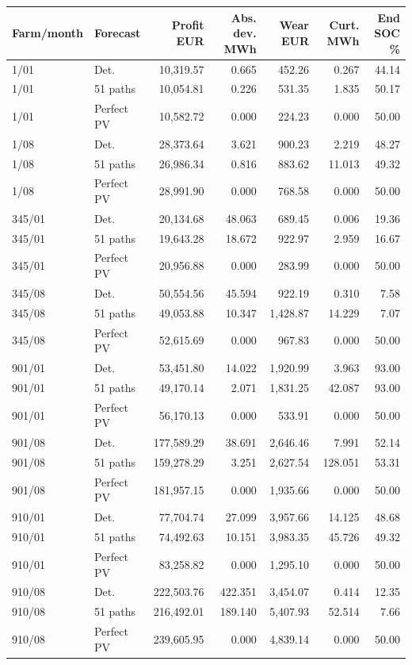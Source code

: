 \begingroup\small
\begin{longtable}{llrrrrr}
\toprule
Farm/month & Forecast & Profit EUR & Abs. dev. MWh & Wear EUR & Curt. MWh & End SOC \%\\
\midrule\endhead
1/01 & Det. & 10,319.57 & 0.665 & 452.26 & 0.267 & 44.14\\
1/01 & 51 paths & 10,054.81 & 0.226 & 531.35 & 1.835 & 50.17\\
1/01 & Perfect PV & 10,582.72 & 0.000 & 224.23 & 0.000 & 50.00\\
1/08 & Det. & 28,373.64 & 3.621 & 900.23 & 2.219 & 48.27\\
1/08 & 51 paths & 26,986.34 & 0.816 & 883.62 & 11.013 & 49.32\\
1/08 & Perfect PV & 28,991.90 & 0.000 & 768.58 & 0.000 & 50.00\\
345/01 & Det. & 20,134.68 & 48.063 & 689.45 & 0.006 & 19.36\\
345/01 & 51 paths & 19,643.28 & 18.672 & 922.97 & 2.959 & 16.67\\
345/01 & Perfect PV & 20,956.88 & 0.000 & 283.99 & 0.000 & 50.00\\
345/08 & Det. & 50,554.56 & 45.594 & 922.19 & 0.310 & 7.58\\
345/08 & 51 paths & 49,053.88 & 10.347 & 1,428.87 & 14.229 & 7.07\\
345/08 & Perfect PV & 52,615.69 & 0.000 & 967.83 & 0.000 & 50.00\\
901/01 & Det. & 53,451.80 & 14.022 & 1,920.99 & 3.963 & 93.00\\
901/01 & 51 paths & 49,170.14 & 2.071 & 1,831.25 & 42.087 & 93.00\\
901/01 & Perfect PV & 56,170.13 & 0.000 & 533.91 & 0.000 & 50.00\\
901/08 & Det. & 177,589.29 & 38.691 & 2,646.46 & 7.991 & 52.14\\
901/08 & 51 paths & 159,278.29 & 3.251 & 2,627.54 & 128.051 & 53.31\\
901/08 & Perfect PV & 181,957.15 & 0.000 & 1,935.66 & 0.000 & 50.00\\
910/01 & Det. & 77,704.74 & 27.099 & 3,957.66 & 14.125 & 48.68\\
910/01 & 51 paths & 74,492.63 & 10.151 & 3,983.35 & 45.726 & 49.32\\
910/01 & Perfect PV & 83,258.82 & 0.000 & 1,295.10 & 0.000 & 50.00\\
910/08 & Det. & 222,503.76 & 422.351 & 3,454.07 & 0.414 & 12.35\\
910/08 & 51 paths & 216,492.01 & 189.140 & 5,407.93 & 52.514 & 7.66\\
910/08 & Perfect PV & 239,605.95 & 0.000 & 4,839.14 & 0.000 & 50.00\\
\bottomrule
\end{longtable}
\endgroup
